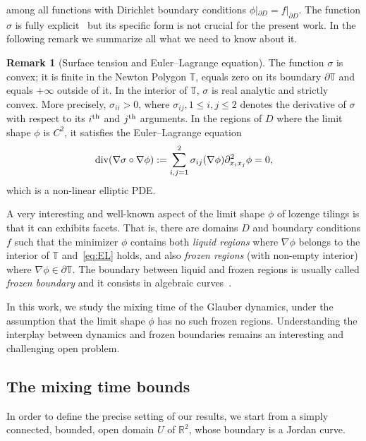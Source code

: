 \documentclass[10pt]{amsart}
\theoremstyle{definition}\newtheorem{defi}[theo]{Definition}\newtheorem{rema}[theo]{Remark}\newtheorem{exam}[theo]{Example}\newtheorem{exem}[theo]{Example}\newtheorem{nota}[theo]{Notation}
\newcommand{\R}{\mathbb{R}}
\newcommand{\bbT}{\mathbb{T}}
\begin{document}
among all functions with Dirichlet boundary conditions $\phi|_{\partial D}=f|_{\partial D}$. The function $\sigma$ is fully explicit~\cite{Kenyon-lectures} but its specific form is not crucial for the present work. In the following remark we summarize all what we need to know about it.

\begin{rema}[Surface tension and Euler--Lagrange equation]
The function $\sigma$ is convex; it is finite in the Newton Polygon $\bbT$, equals zero on its boundary $\partial \bbT$ and equals $+\infty$ outside of it. In the interior of $\bbT$, $\sigma$ is real analytic and strictly convex. More precisely, $\sigma_{ii}>0$, where $\sigma_{ij},1\le i,j\le 2$ denotes the derivative of $\sigma$ with respect to its $i^{\rm th}$ and $j^{\rm th}$ arguments. In the regions of $D$ where the limit shape $\phi$ is $C^2$, it satisfies the Euler--Lagrange equation
\begin{equation}\label{eq:EL}
{\rm div} (\nabla\sigma\circ\nabla \phi):=\sum_{i,j=1}^2 \sigma_{ij}(\nabla\phi)\partial^2_{x_i x_j}\phi= 0,
\end{equation}
which is a non-linear elliptic PDE.
\end{rema}

A very interesting and well-known aspect of the limit shape $\phi$ of lozenge tilings is that it can exhibits facets. That is, there are domains $D$ and boundary conditions $f$ such that the minimizer $\phi$ contains both \emph{liquid regions} where $\nabla \phi$ belongs to the interior of $\bbT$ and~\eqref{eq:EL} holds, and also \emph{frozen regions} (with non-empty interior) where $\nabla\phi\in \partial
\bbT$. The boundary between liquid and frozen regions is usually called \emph{frozen boundary} and it consists in algebraic curves~\cite{Duse,KO}.

In this work, we study the mixing time of the Glauber dynamics, under the assumption that the limit shape $\phi$ has no such frozen regions. Understanding the interplay between dynamics and frozen boundaries remains an interesting and challenging open problem.

\subsection{The mixing time bounds}

In order to define the precise setting of our results, we start from a simply connected, bounded, open domain $U$ of $\R^2$, whose boundary is a Jordan curve.
\end{document}
